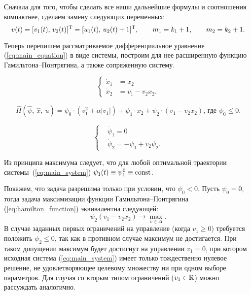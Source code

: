 Сначала для того, чтобы сделать все наши дальнейшие формулы и соотношения компактнее, сделаем замену следующих переменных:
$$
        v(t) = [v_1(t),\,v_2(t)]^{\mathrm{T}} = [u_1(t),\, u_2(t) + 1]^{\mathrm{T}},
        \qquad
        m_1 = k_1 + 1,
        \qquad
        m_2 = k_2 + 1. 
$$

Теперь перепишем рассматриваемое дифференциальное уравнение (\ref{eq:main_equation}) в виде системы, построим для нее расширенную функцию Гамильтона--Понтрягина, а также сопряженную систему.

\begin{equation} \label{eq:main_system}
        \left\{
        \begin{aligned}
                \dot x_1 &= x_2 \\
                \dot x_2 &= v_1 - v_2x_2.
        \end{aligned}
        \right.
\end{equation}

\begin{equation} \label{eq:hamilton_function}
        \hat H (\hat\psi,\: \hat x,\: u) = \psi_0\cdot(v_1^2 + \alpha |v_1|) + \psi_1\cdot x_2 + \psi_2\cdot(v_1 - v_2x_2) \mbox{, где $\psi_0 \leqslant 0.$}
\end{equation} 
        
\begin{equation}\label{eq:auxiliary_system}
        \left\{
        \begin{aligned}
                &\dot\psi_1 = 0\\
                &\dot\psi_2 = -\psi_1 + v_2\psi_2.
        \end{aligned}
        \right.
\end{equation}

\begin{remark}
        Из принципа максимума следует, что для любой оптимальной траектории системы~(\ref{eq:main_system}) $\psi_1(t) \equiv \psi_1^0 \equiv \operatorname{const}$.
\end{remark}

\begin{remark}
        Покажем, что задача разрешима только при условии, что $\psi_0 < 0$. Пусть $\psi_0 = 0$, тогда задача максимизации функции Гамильтона--Понтрягина (\ref{eq:hamilton_function}) эквивалентна следующей:
        $$
                \psi_2(v_1 - v_2x_2) \to \max\limits_{v \in \Delta}.
        $$
        В случае заданных первых ограничений на управление (когда $v_1 \geqslant 0$) требуется положить $\psi_2 \leqslant 0$, так как в противном случае максимум не достигается. При таком допущении максимум будет достигнут на управлении $v_1 = 0$, при котором исходная система (\ref{eq:main_system}) имеет только тождественно нулевое решение, не удовлетворяющее целевому множеству ни при одном выборе параметров. Для случая со вторым типом ограничений ($v_1 \in \mathbb{R}$) можно рассуждать аналогично.
\end{remark}

